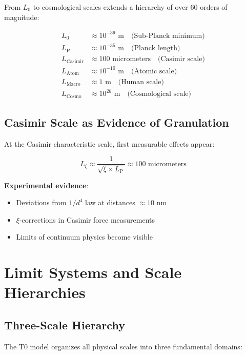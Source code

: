\documentclass[12pt,a4paper]{article}
\newcommand{\xipar}{\xi}
\newcommand{\Lzero}{L_0}
\newcommand{\Lp}{L_{\text{P}}}
\theoremstyle{definition}
\theoremstyle{remark}
\begin{document}
	From $\Lzero$ to cosmological scales extends a hierarchy of over 60 orders of magnitude:
	
	\begin{align}
		\Lzero &\approx 10^{-39} \text{ m} \quad \text{(Sub-Planck minimum)} \\
		\Lp &\approx 10^{-35} \text{ m} \quad \text{(Planck length)} \\
		L_{\text{Casimir}} &\approx 100 \text{ micrometers} \quad \text{(Casimir scale)} \\
		L_{\text{Atom}} &\approx 10^{-10} \text{ m} \quad \text{(Atomic scale)} \\
		L_{\text{Macro}} &\approx 1 \text{ m} \quad \text{(Human scale)} \\
		L_{\text{Cosmo}} &\approx 10^{26} \text{ m} \quad \text{(Cosmological scale)}
	\end{align}
	
	\subsection{Casimir Scale as Evidence of Granulation}
	
	At the Casimir characteristic scale, first measurable effects appear:
	
	\begin{equation}
		L_{\xipar} \approx \frac{1}{\sqrt{\xipar \times \Lp}} \approx 100 \text{ micrometers}
	\end{equation}
	
	\textbf{Experimental evidence}:
	\begin{itemize}
		\item Deviations from $1/d^4$ law at distances $\approx 10$ nm
		\item $\xipar$-corrections in Casimir force measurements
		\item Limits of continuum physics become visible
	\end{itemize}
	
	\section{Limit Systems and Scale Hierarchies}
	
	\subsection{Three-Scale Hierarchy}
	
	The T0 model organizes all physical scales into three fundamental domains:
	
\end{document}
